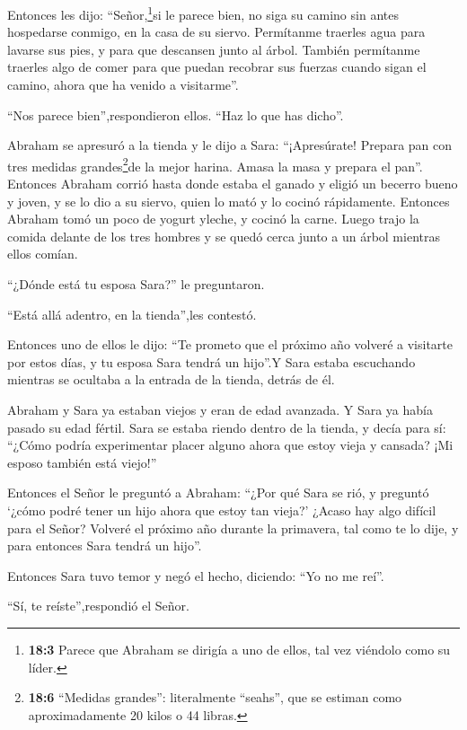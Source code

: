  Entonces les dijo: ``Señor,\footnote{\textbf{18:3} Parece
  que Abraham se dirigía a uno de ellos, tal vez viéndolo como su líder.}si
le parece bien, no siga su camino sin antes hospedarse conmigo, en la
casa de su siervo.  Permítanme traerles agua para lavarse
sus pies, y para que descansen junto al árbol.  También
permítanme traerles algo de comer para que puedan recobrar sus fuerzas
cuando sigan el camino, ahora que ha venido a visitarme''.

``Nos parece bien'',respondieron ellos. ``Haz lo que has dicho''.

 Abraham se apresuró a la tienda y le dijo a Sara:
``¡Apresúrate! Prepara pan con tres medidas grandes\footnote{\textbf{18:6}
  ``Medidas grandes'': literalmente ``seahs'', que se estiman como
  aproximadamente 20 kilos o 44 libras.}de la mejor harina. Amasa la
masa y prepara el pan''.  Entonces Abraham corrió hasta
donde estaba el ganado y eligió un becerro bueno y joven, y se lo dio a
su siervo, quien lo mató y lo cocinó rápidamente.  Entonces
Abraham tomó un poco de yogurt yleche, y cocinó la carne. Luego trajo la
comida delante de los tres hombres y se quedó cerca junto a un árbol
mientras ellos comían.

 ``¿Dónde está tu esposa Sara?'' le preguntaron.

``Está allá adentro, en la tienda'',les contestó.

 Entonces uno de ellos le dijo: ``Te prometo que el próximo
año volveré a visitarte por estos días, y tu esposa Sara tendrá un
hijo''.Y Sara estaba escuchando mientras se ocultaba a la entrada de la
tienda, detrás de él.

 Abraham y Sara ya estaban viejos y eran de edad avanzada.
Y Sara ya había pasado su edad fértil.  Sara se estaba
riendo dentro de la tienda, y decía para sí: ``¿Cómo podría experimentar
placer alguno ahora que estoy vieja y cansada? ¡Mi esposo también está
viejo!''

 Entonces el Señor le preguntó a Abraham: ``¿Por qué Sara
se rió, y preguntó `¿cómo podré tener un hijo ahora que estoy tan
vieja?'  ¿Acaso hay algo difícil para el Señor? Volveré el
próximo año durante la primavera, tal como te lo dije, y para entonces
Sara tendrá un hijo''.

 Entonces Sara tuvo temor y negó el hecho, diciendo: ``Yo
no me reí''.

``Sí, te reíste'',respondió el Señor.

